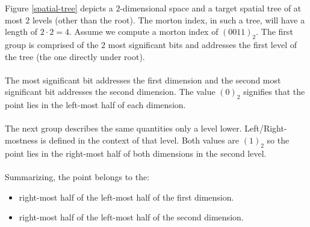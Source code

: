 \documentclass{juliacon}
\begin{document}
\begin{example}
  Figure \ref{spatial-tree} depicts a $2$-dimensional space and a target spatial
  tree of at most $2$ levels (other than the root). The morton index, in such a tree,
  will have a length of $2\cdot2=4$. Assume we compute a morton index of $(0011)_2$.
  The first group is comprised of the $2$ most significant bits and addresses the first
  level of the tree (the one directly under root).
  \\\\
  The most significant bit addresses the first dimension and the second most significant
  bit addresses the second dimension. The value $(0)_2$ signifies that the point lies in
  the left-most half of each dimension.
  \\\\
  The next group describes the same quantities only a level lower. Left/Right-mostness
  is defined in the context of that level. Both values are $(1)_2$ so the point lies in
  the right-most half of both dimensions in the second level.
  \\\\
  Summarizing, the point belongs to the:
  \begin{itemize}
    \item right-most half of the left-most half of the first dimension.
    \item right-most half of the left-most half of the second dimension.
  \end{itemize}


\end{example}
\end{document}

